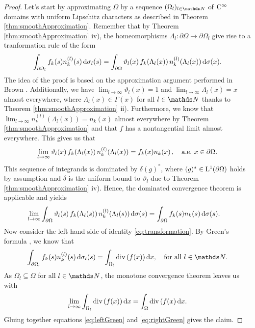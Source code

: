 \begin{proof}
  Let's start by approximating $\Omega$ by a sequence $(\Omega_l)_{l \in \N}$ of $\mathrm{C}^\infty$ domains with uniform Lipschitz characters as described in Theorem \ref{thm:smoothApproximation}. 
  Remember that by Theorem \ref{thm:smoothApproximation} iv), the homeomorphisms $\Lambda_l \colon \partial\Omega \to \partial\Omega_l$ give rise to a tranformation rule of the form 
  \begin{align}
    \label{eq:transformation}
    \int_{\partial\Omega_l} f_k(s) n_k^{(l)}(s) \, {\operatorname{d}\!{\sigma}}_l(s)
    = \int_{\partial\Omega} \vartheta_l(x) \, f_k(\Lambda_l(x)) \, n_k^{(l)}(\Lambda_l(x)) \, {\operatorname{d}\!{\sigma}}(x).
  \end{align}
  The idea of the proof is based on the approximation argument performed in Brown \cite[Prop.\@~2.4]{brown}. 
  Additionally, we have $\lim_{l \to \infty} \vartheta_l(x) = 1$ and $\lim_{l \to \infty} \Lambda_l(x) = x$ almost everywhere, where $\Lambda_l(x) \in \Gamma(x)$ for all $l \in \N$ thanks to Theorem \ref{thm:smoothApproximation} ii).
  Furthermore, we know that $\lim_{l \to \infty} n_k^{(l)}(\Lambda_l(x)) = n_k(x)$ almost everywhere by Theorem \ref{thm:smoothApproximation} and that $f$ has a nontangential limit almost everywhere.
  This gives us that 
  \begin{align*}
    \lim_{l \to \infty} \vartheta_l(x) \, f_k(\Lambda_l(x)) \, n_k^{(l)}(\Lambda_l(x)) = f_k(x) n_k(x)\,, \quad\text{a.e.\@ } x \in \partial\Omega.
  \end{align*}
  This sequence of integrands is dominated by $\delta (g)^*$, where $(g)^* \in \mathrm{L}^1(\partial\Omega)$ holds by assumption and $\delta$ is the uniform bound to $\vartheta_l$ due to Theorem \ref{thm:smoothApproximation} iv).
  Hence, the dominated convergence theorem is applicable and yields
  \begin{align}
    \label{eq:leftGreen}
    \lim_{l \to \infty} \int_{\partial \Omega} \vartheta_l(s) \, f_k(\Lambda_l(s))\,  n_k^{(l)}(\Lambda_l(s))\, {\operatorname{d}\!{\sigma}}(s)
    &= 
    \int_{\partial\Omega} f_k(s) n_k(s) \, {\operatorname{d}\!{\sigma}}(s).
  \end{align}
  Now consider the left hand side of identity \eqref{eq:transformation}.
  By Green's formula \cite[p.\@~711f.]{evans}, we know that
  \begin{align*}
    \int_{\partial\Omega_l} f_k(s) n_k^{(l)}(s) \d\sigma_l(s)
    = \int_{\Omega_l} \div(f(x)) \d x, \quad\text{for all } l \in \N.
  \end{align*}
  As $\Omega_l \subseteq \Omega$ for all $l \in \N$, the monotone convergence theorem leaves us with
  \begin{align}
    \label{eq:rightGreen}
    \lim_{l \to \infty} \int_{\Omega_l} \mathrm{div\,} (f(x)) \, {\operatorname{d}\!{x}} = \int_\Omega \mathrm{div\,} (f(x) \, {\operatorname{d}\!{x}}.
  \end{align}
  Gluing together equations \eqref{eq:leftGreen} and \eqref{eq:rightGreen} gives the claim.
\end{proof}

